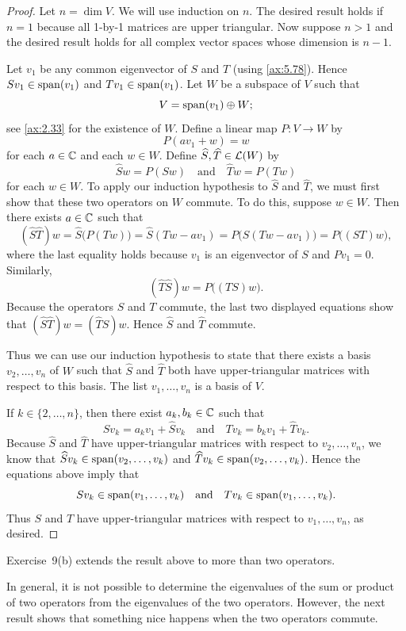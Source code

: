 \begin{proof}
Let $n=\dim V$. We will use induction on $n$. The desired result holds if $n=1$
because all 1-by-1 matrices are upper triangular. Now suppose $n>1$ and the
desired result holds for all complex vector spaces whose dimension is $n-1$.

Let $v_1$ be any common eigenvector of $S$ and $T$ (using \ref{ax:5.78}).
Hence $Sv_1\in\operatorname{span}(v_1)$ and $Tv_1\in\operatorname{span}(v_1)$. Let $W$ be a subspace of $V$
such that
\[ V = \operatorname{span}(v_1)\oplus W; \]
see \ref{ax:2.33} for the existence of $W$. Define a linear map
$P\colon V\to W$ by
\[ P(av_1+w) = w \]
for each $a\in\mathbb{C}$ and each $w\in W$. Define
$\widehat{S},\widehat{T}\in\Lin(W)$ by
\[ \widehat{S}w = P(Sw) \quad\text{and}\quad \widehat{T}w = P(Tw) \]
for each $w\in W$. To apply our induction hypothesis to $\widehat{S}$ and
$\widehat{T}$, we must first show that these two operators on $W$ commute. To
do this, suppose $w\in W$. Then there exists $a\in\mathbb{C}$ such that
\[ (\widehat{S}\widehat{T})w = \widehat{S}\bigl(P(Tw)\bigr)
   = \widehat{S}(Tw-av_1) = P\bigl(S(Tw-av_1)\bigr) = P\bigl((ST)w\bigr), \]
where the last equality holds because $v_1$ is an eigenvector of $S$ and
$Pv_1=0$. Similarly,
\[ (\widehat{T}\widehat{S})w = P\bigl((TS)w\bigr). \]
Because the operators $S$ and $T$ commute, the last two displayed equations
show that $(\widehat{S}\widehat{T})w=(\widehat{T}\widehat{S})w$. Hence
$\widehat{S}$ and $\widehat{T}$ commute.

Thus we can use our induction hypothesis to state that there exists a basis
$v_2,\allowbreak\dots,v_n$ of $W$ such that $\widehat{S}$ and $\widehat{T}$ both have
upper-triangular matrices with respect to this basis. The list
$v_1,\dots,v_n$ is a basis of $V$.

If $k\in\{2,\dots,n\}$, then there exist $a_k,b_k\in\mathbb{C}$ such that
\[ Sv_k = a_kv_1+\widehat{S}v_k \quad\text{and}\quad
   Tv_k = b_kv_1+\widehat{T}v_k. \]
Because $\widehat{S}$ and $\widehat{T}$ have upper-triangular matrices with
respect to $v_2,\dots,v_n$, we know that
$\widehat{S}v_k\in\spn(v_2,\dots,v_k)$ and
$\widehat{T}v_k\in\spn(v_2,\dots,v_k)$. Hence the equations above imply that
\[ Sv_k\in\operatorname{span}(v_1,\dots,v_k) \quad\text{and}\quad
   Tv_k\in\operatorname{span}(v_1,\dots,v_k). \]
Thus $S$ and $T$ have upper-triangular matrices with respect to
$v_1,\dots,v_n$, as desired.
\end{proof}

Exercise~9(b) extends the result above to more than two operators.

In general, it is not possible to determine the eigenvalues of the sum or
product of two operators from the eigenvalues of the two operators. However,
the next result shows that something nice happens when the two operators
commute.

